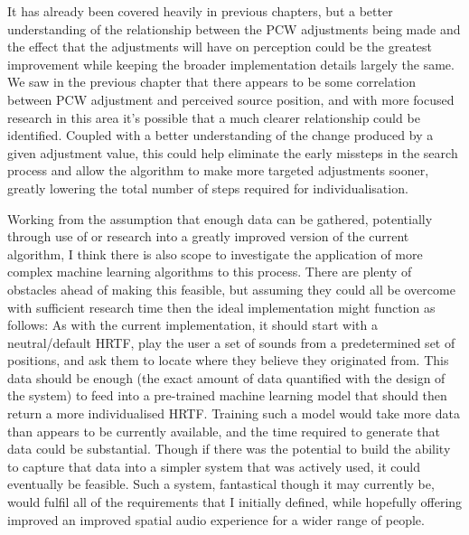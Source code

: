 It has already been covered heavily in previous chapters, but a better understanding of the relationship between the PCW adjustments being made and the effect that the adjustments will have on perception could be the greatest improvement while keeping the broader implementation details largely the same. We saw in the previous chapter that there appears to be some correlation between PCW adjustment and perceived source position, and with more focused research in this area it's possible that a much clearer relationship could be identified. Coupled with a better understanding of the change produced by a given adjustment value, this could help eliminate the early missteps in the search process and allow the algorithm to make more targeted adjustments sooner, greatly lowering the total number of steps required for individualisation.

Working from the assumption that enough data can be gathered, potentially through use of or research into a greatly improved version of the current algorithm, I think there is also scope to investigate the application of more complex machine learning algorithms to this process. There are plenty of obstacles ahead of making this feasible, but assuming they could all be overcome with sufficient research time then the ideal implementation might function as follows: As with the current implementation, it should start with a neutral/default HRTF, play the user a set of sounds from a predetermined set of positions, and ask them to locate where they believe they originated from. This data should be enough (the exact amount of data quantified with the design of the system) to feed into a pre-trained machine learning model that should then return a more individualised HRTF. Training such a model would take more data than appears to be currently available, and the time required to generate that data could be substantial. Though if there was the potential to build the ability to capture that data into a simpler system that was actively used, it could eventually be feasible. Such a system, fantastical though it may currently be, would fulfil all of the requirements that I initially defined, while hopefully offering improved an improved spatial audio experience for a wider range of people.

